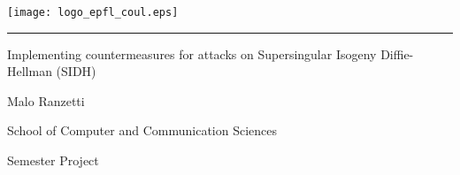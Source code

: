 
%        




\newcommand{\logoepfl}[0]{
  \begin{center}
    \texttt{[image: logo\_epfl\_coul.eps]}
  \end{center}
  \vspace{0.3cm}
  \hrule
}
\newcommand{\logolasec}[0]{
  \vspace{1cm}
  \hrule
  \begin{center}
    \texttt{[image: logo\_lasec\_coul.eps]}
  \end{center}
}
\newcommand{\project}[1]{
  \begin{center}
    \large{#1}
  \end{center}
  \vspace{1cm}
}
\newcommand{\department}[1]{
  \begin{center}
    \large{#1}
  \end{center}
}
\newcommand{\supervisor}[3]{
  \begin{center}
    \begin{normalsize}{
        \bf #1}\\#2\\#3
    \end{normalsize}
  \end{center}
}
\renewcommand{\author}[1]{
  \begin{center}
    \Large{#1}
  \end{center}
  \vspace{0.5cm}
}
\renewcommand{\title}[1]{
  \vspace{3cm}
  \begin{center}
    \huge{#1}
  \end{center}
  \vspace{1.7cm}
}
\renewcommand{\date}[2]{
  \begin{center}
    \normalsize{#1 #2}
  \end{center}
  \vspace{0.5cm}
}


\thispagestyle{empty}


  \logoepfl
  
  \title{Implementing countermeasures for attacks on Supersingular Isogeny Diffie-Hellman (SIDH)}
  
  \author{Malo Ranzetti}
  \department{School of Computer and Communication Sciences}
  \project{Semester Project}
  
